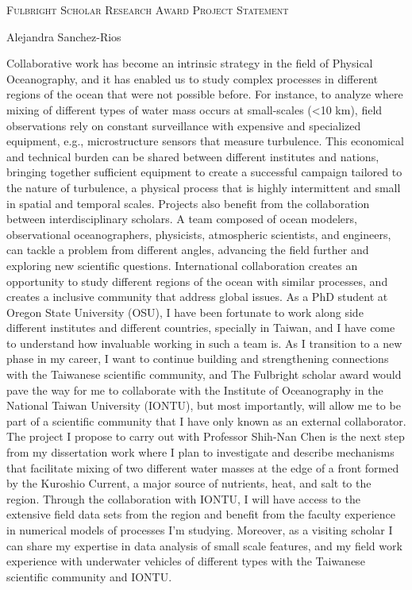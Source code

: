 \documentclass[letterpaper, 12pt ]{article}
\newcommand{\soptitle}{Fulbright Scholar Research Award Project Statement}
\newcommand{\yourname}{Alejandra Sanchez-Rios}
\begin{document}
\begin{center}{\Large \scshape \soptitle}\end{center}
\begin{center}\vspace{0.2em} { \yourname\\}
\end{center}


Collaborative work has become an intrinsic strategy in the field of Physical Oceanography, and it has enabled us to study complex processes in different regions of the ocean that were not possible before. For instance, to analyze where mixing of different types of water mass occurs at small-scales (<10 km), field observations rely on constant surveillance with expensive and specialized equipment, e.g., microstructure sensors that measure turbulence. This economical and technical burden can be shared between different institutes and nations, bringing together sufficient equipment to create a successful campaign tailored to the nature of turbulence, a physical process that is highly intermittent and small in spatial and temporal scales. Projects also benefit from the collaboration between interdisciplinary scholars. A team composed of ocean modelers, observational oceanographers, physicists, atmospheric scientists, and engineers, can tackle a problem from different angles, advancing the field further and exploring new scientific questions. International collaboration creates an opportunity to study different regions of the ocean with similar processes, and creates a inclusive community that address global issues. As a PhD student at Oregon State University (OSU), I have been fortunate to work along side different institutes and different countries, specially in Taiwan, and I have come to understand how invaluable working in such a team is. As I transition to a new phase in my career, I want to continue building and strengthening connections with the Taiwanese scientific community, and The Fulbright scholar award would pave the way for me to collaborate with the Institute of Oceanography in the National Taiwan University (IONTU), but most importantly, will allow me to be part of a scientific community that I have only known as an external collaborator. The project I propose to carry out with Professor Shih-Nan Chen is the next step from my dissertation work where I plan to investigate and describe mechanisms that facilitate mixing of two different water masses at the edge of a front formed by the Kuroshio Current, a major source of nutrients, heat, and salt to the region. Through the collaboration with IONTU, I will have access to the extensive field data sets from the region and benefit from the faculty experience in numerical models of processes I'm studying. Moreover, as a visiting scholar I can share my expertise in data analysis of small scale features, and my field work experience with underwater vehicles of different types with the Taiwanese scientific community and IONTU. 
\end{document}
